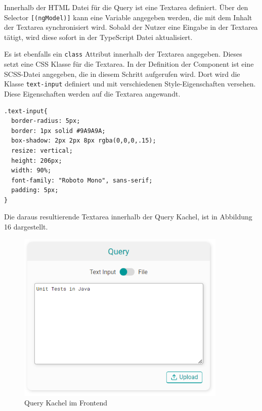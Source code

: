 Innerhalb der HTML Datei für die Query ist eine Textarea definiert. Über den Selector \texttt{[(ngModel)]} kann eine Variable angegeben werden, die mit dem Inhalt der Textarea synchronisiert wird. Sobald der Nutzer eine Eingabe in der Textarea tätigt, wird diese sofort in der TypeScript Datei aktualisiert. 

Es ist ebenfalls ein \texttt{class} Attribut innerhalb der Textarea angegeben. Dieses setzt eine CSS Klasse für die Textarea. In der Definition der Component ist eine SCSS-Datei angegeben, die in diesem Schritt aufgerufen wird. Dort wird die Klasse \texttt{text-input} definiert und mit verschiedenen Style-Eigenschaften versehen. Diese Eigenschaften werden auf die Textarea angewandt.  

\begin{lstlisting}[caption={Style-Definition innerhalb einer SCSS-Datei}]
.text-input{
  border-radius: 5px;
  border: 1px solid #9A9A9A;
  box-shadow: 2px 2px 8px rgba(0,0,0,.15);
  resize: vertical;
  height: 206px;
  width: 90%;
  font-family: "Roboto Mono", sans-serif;
  padding: 5px;
}
\end{lstlisting}

Die daraus resultierende Textarea innerhalb der \glqq Query\grqq{} Kachel, ist in Abbildung 16 dargestellt.

\begin{figure}[H]
  \centering
    \includegraphics[width = 10cm]{bilder/websiteQuery}
    \caption{Query Kachel im Frontend}
\end{figure}


